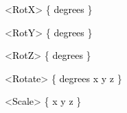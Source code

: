 \documentclass[a4paper]{article}
\newcommand\textstyleOOoComputerKeyWord[1]{\textrm{\textcolor[rgb]{0.0,0.0,0.5019608}{#1}}}
\newcommand\textstyleOOoAssemblerSpecialChar[1]{\textrm{\textcolor[rgb]{0.0,0.5019608,0.0}{#1}}}
\newcommand\textstyleOOoAssemblerIdent[1]{\textrm{\textcolor{black}{#1}}}
\begin{document}
{\color{black}
\textstyleOOoComputerKeyWord{\textcolor{black}{\ \ \ \ \ \ }}\textstyleOOoAssemblerSpecialChar{{\textless}}\textstyleOOoAssemblerIdent{RotX}\textstyleOOoAssemblerSpecialChar{{\textgreater}}\textstyleOOoComputerKeyWord{\textcolor{black}{
}}\textstyleOOoAssemblerSpecialChar{\{}\textstyleOOoComputerKeyWord{\textcolor{black}{
}}\textstyleOOoAssemblerIdent{degrees}\textstyleOOoComputerKeyWord{\textcolor{black}{
}}\textstyleOOoAssemblerSpecialChar{\}}}

{\color{black}
\textstyleOOoComputerKeyWord{\textcolor{black}{\ \ \ \ \ \ }}\textstyleOOoAssemblerSpecialChar{{\textless}}\textstyleOOoAssemblerIdent{RotY}\textstyleOOoAssemblerSpecialChar{{\textgreater}}\textstyleOOoComputerKeyWord{\textcolor{black}{
}}\textstyleOOoAssemblerSpecialChar{\{}\textstyleOOoComputerKeyWord{\textcolor{black}{
}}\textstyleOOoAssemblerIdent{degrees}\textstyleOOoComputerKeyWord{\textcolor{black}{
}}\textstyleOOoAssemblerSpecialChar{\}}}

{\color{black}
\textstyleOOoComputerKeyWord{\textcolor{black}{\ \ \ \ \ \ }}\textstyleOOoAssemblerSpecialChar{{\textless}}\textstyleOOoAssemblerIdent{RotZ}\textstyleOOoAssemblerSpecialChar{{\textgreater}}\textstyleOOoComputerKeyWord{\textcolor{black}{
}}\textstyleOOoAssemblerSpecialChar{\{}\textstyleOOoComputerKeyWord{\textcolor{black}{
}}\textstyleOOoAssemblerIdent{degrees}\textstyleOOoComputerKeyWord{\textcolor{black}{
}}\textstyleOOoAssemblerSpecialChar{\}}}

{\color{black}
\textstyleOOoComputerKeyWord{\textcolor{black}{\ \ \ \ \ \ }}\textstyleOOoAssemblerSpecialChar{{\textless}}\textstyleOOoAssemblerIdent{Rotate}\textstyleOOoAssemblerSpecialChar{{\textgreater}}\textstyleOOoComputerKeyWord{\textcolor{black}{
}}\textstyleOOoAssemblerSpecialChar{\{}\textstyleOOoComputerKeyWord{\textcolor{black}{
}}\textstyleOOoAssemblerIdent{degrees}\textstyleOOoComputerKeyWord{\textcolor{black}{
}}\textstyleOOoAssemblerIdent{x}\textstyleOOoComputerKeyWord{\textcolor{black}{
}}\textstyleOOoAssemblerIdent{y}\textstyleOOoComputerKeyWord{\textcolor{black}{
}}\textstyleOOoAssemblerIdent{z}\textstyleOOoComputerKeyWord{\textcolor{black}{
}}\textstyleOOoAssemblerSpecialChar{\}}}

{\color{black}
\textstyleOOoComputerKeyWord{\textcolor{black}{\ \ \ \ \ \ }}\textstyleOOoAssemblerSpecialChar{{\textless}}\textstyleOOoAssemblerIdent{Scale}\textstyleOOoAssemblerSpecialChar{{\textgreater}}\textstyleOOoComputerKeyWord{\textcolor{black}{
}}\textstyleOOoAssemblerSpecialChar{\{}\textstyleOOoComputerKeyWord{\textcolor{black}{
}}\textstyleOOoAssemblerIdent{x}\textstyleOOoComputerKeyWord{\textcolor{black}{
}}\textstyleOOoAssemblerIdent{y}\textstyleOOoComputerKeyWord{\textcolor{black}{
}}\textstyleOOoAssemblerIdent{z}\textstyleOOoComputerKeyWord{\textcolor{black}{
}}\textstyleOOoAssemblerSpecialChar{\}}}
\end{document}
